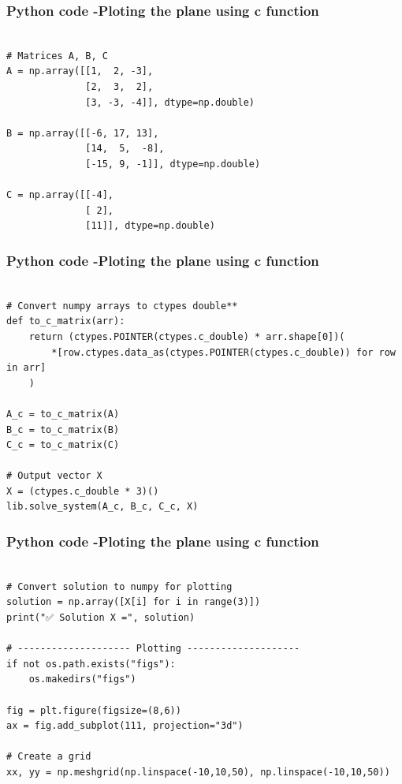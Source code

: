 \documentclass{beamer}
\begin{document}
	
\begin{frame}[fragile]                              
	\frametitle{Python code -Ploting the plane using c function} 
	\begin{lstlisting}

# Matrices A, B, C
A = np.array([[1,  2, -3],
              [2,  3,  2],
              [3, -3, -4]], dtype=np.double)

B = np.array([[-6, 17, 13],
              [14,  5,  -8],
              [-15, 9, -1]], dtype=np.double)

C = np.array([[-4],
              [ 2],
              [11]], dtype=np.double)
\end{lstlisting}
\end{frame}

	
\begin{frame}[fragile]                              
	\frametitle{Python code -Ploting the plane using c function} 
	\begin{lstlisting}

# Convert numpy arrays to ctypes double**
def to_c_matrix(arr):
    return (ctypes.POINTER(ctypes.c_double) * arr.shape[0])(
        *[row.ctypes.data_as(ctypes.POINTER(ctypes.c_double)) for row in arr]
    )

A_c = to_c_matrix(A)
B_c = to_c_matrix(B)
C_c = to_c_matrix(C)

# Output vector X
X = (ctypes.c_double * 3)()
lib.solve_system(A_c, B_c, C_c, X)
\end{lstlisting}
\end{frame}

	
\begin{frame}[fragile]                              
	\frametitle{Python code -Ploting the plane using c function} 
	\begin{lstlisting}

# Convert solution to numpy for plotting
solution = np.array([X[i] for i in range(3)])
print("✅ Solution X =", solution)

# -------------------- Plotting --------------------
if not os.path.exists("figs"):
    os.makedirs("figs")

fig = plt.figure(figsize=(8,6))
ax = fig.add_subplot(111, projection="3d")

# Create a grid
xx, yy = np.meshgrid(np.linspace(-10,10,50), np.linspace(-10,10,50))
\end{lstlisting}
\end{frame}
\end{document}
